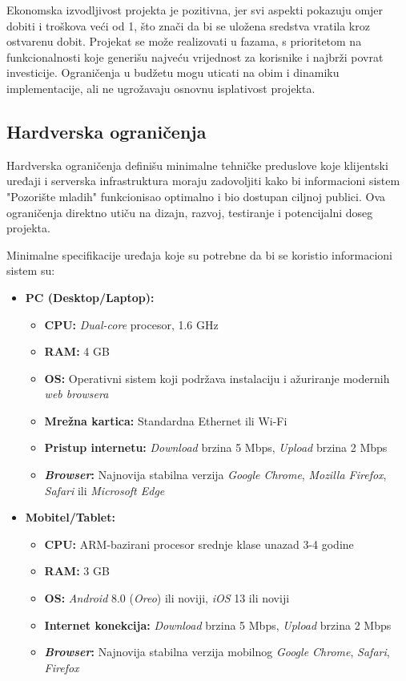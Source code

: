 Ekonomska izvodljivost projekta je pozitivna, jer svi aspekti pokazuju omjer dobiti i troškova veći od 1, što znači da bi se uložena sredstva vratila kroz ostvarenu dobit. Projekat se može realizovati u fazama, s prioritetom na funkcionalnosti koje generišu najveću vrijednost za korisnike i najbrži povrat investicije. Ograničenja u budžetu mogu uticati na obim i dinamiku implementacije, ali ne ugrožavaju osnovnu isplativost projekta.

\sloppy
\subsection{Hardverska ograničenja}


Hardverska ograničenja definišu minimalne tehničke preduslove koje klijentski uređaji i serverska infrastruktura moraju zadovoljiti kako bi informacioni sistem "Pozorište mladih" funkcionisao optimalno i bio dostupan ciljnoj publici. Ova ograničenja direktno utiču na dizajn, razvoj, testiranje i potencijalni doseg projekta.

Minimalne specifikacije uređaja koje su potrebne da bi se koristio informacioni sistem su:

\begin{itemize}
    \item \textbf{PC (Desktop/Laptop):}
        \begin{itemize}
            \item \textbf{CPU:} \textit{Dual-core} procesor, 1.6 GHz
            \item \textbf{RAM:} 4 GB
            \item \textbf{OS:} Operativni sistem koji podržava instalaciju i ažuriranje modernih \textit{web browsera}
            \item \textbf{Mrežna kartica:} Standardna Ethernet ili Wi-Fi
            \item \textbf{Pristup internetu:} \textit{Download} brzina 5 Mbps, \textit{Upload} brzina 2 Mbps
            \item \textbf{\textit{Browser}:} Najnovija stabilna verzija \textit{Google Chrome}, \textit{Mozilla Firefox}, \textit{Safari} ili \textit{Microsoft Edge}
        \end{itemize}
    \item \textbf{Mobitel/Tablet:}
        \begin{itemize}
            \item \textbf{CPU:} ARM-bazirani procesor srednje klase unazad 3-4 godine
            \item \textbf{RAM:} 3 GB
            \item \textbf{OS:} \textit{Android} 8.0 (\textit{Oreo}) ili noviji, \textit{iOS} 13 ili noviji
            \item \textbf{Internet konekcija:} \textit{Download} brzina 5 Mbps, \textit{Upload} brzina 2 Mbps
            \item \textbf{\textit{Browser}:} Najnovija stabilna verzija mobilnog \textit{Google Chrome}, \textit{Safari}, \textit{Firefox}
        \end{itemize}
\end{itemize}

